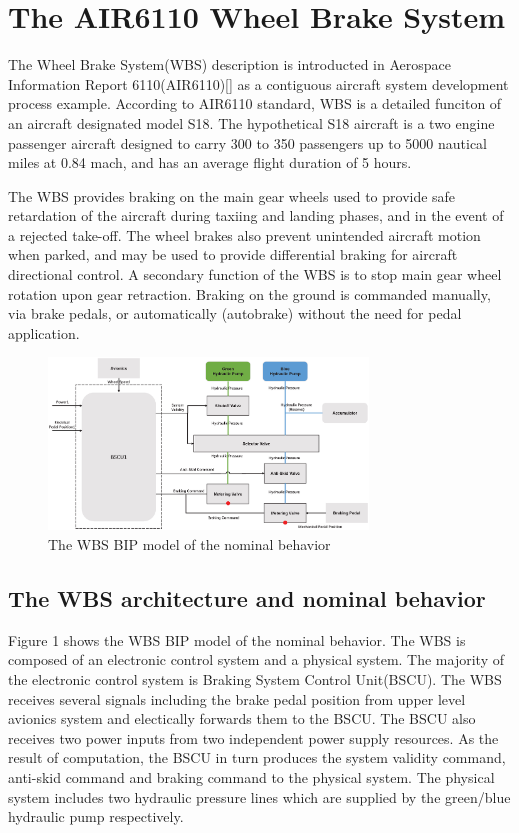 \documentclass[conference]{IEEEtran}
\begin{document}
\section{The AIR6110 Wheel Brake System}
The Wheel Brake System(WBS) description is introducted in Aerospace Information Report 6110(AIR6110)[] as a contiguous aircraft system development process example. According to AIR6110 standard, WBS is a detailed funciton of an aircraft designated model S18. The hypothetical S18 aircraft is a two engine passenger aircraft designed to carry 300 to 350 passengers up to 5000 nautical miles at
0.84 mach, and has an average flight duration of 5 hours. 

The WBS provides braking on the main gear wheels used to provide safe retardation of the aircraft during taxiing and landing phases, and in the event of a rejected take-off. The wheel brakes also prevent unintended aircraft motion when parked, and may be used to provide differential braking for aircraft directional control. A secondary function of the WBS is to stop main gear wheel rotation upon gear retraction. Braking on the ground is commanded manually, via brake pedals, or automatically (autobrake) without the need for pedal application.

\begin{figure}[htbp]
	\centerline{\includegraphics[width=85mm]{figure/Nominal.eps}}
	\caption{The WBS BIP model of the nominal behavior}
	\label{WBS_BIP_Nominal}
\end{figure}

\subsection{The WBS architecture and nominal behavior}
Figure 1 shows the WBS BIP model of the nominal behavior. The WBS is composed of an electronic control system and a physical system. The majority of the electronic control system is Braking System Control Unit(BSCU). The WBS receives several signals including the brake pedal position from upper level avionics system and electically forwards them to the BSCU. The BSCU also receives two power inputs from two independent power supply resources. As the result of computation, the BSCU in turn produces the system validity command, anti-skid command and braking command to the physical system. The physical system includes two hydraulic pressure lines which are supplied by the green/blue hydraulic pump respectively.
\end{document}

